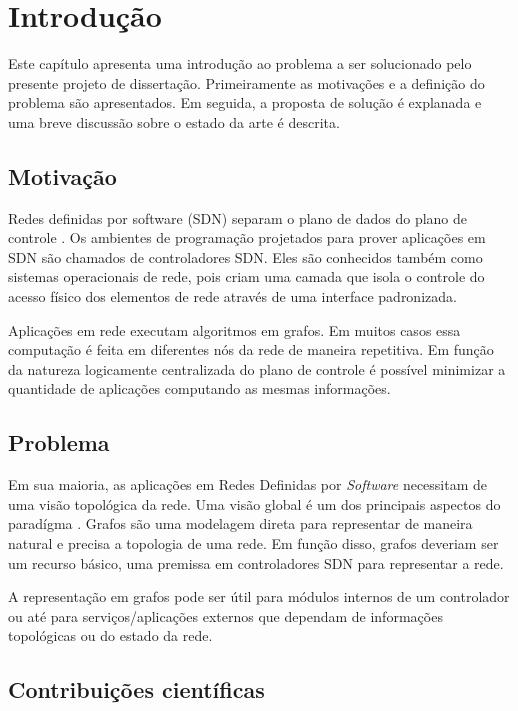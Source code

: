 \chapter{Introdução}
\label{chap:introduction}

Este capítulo apresenta uma introdução ao problema a ser solucionado pelo 
presente projeto de dissertação. 
Primeiramente as motivações e a definição do problema são apresentados. 
Em seguida, a proposta de solução é explanada e uma breve discussão sobre 
o estado da arte é descrita.

\section{Motivação}

Redes definidas por software (SDN) separam o plano de dados do plano 
de controle \citep{guedes2012redes}.
Os ambientes de programação projetados para prover aplicações em SDN são 
chamados de controladores SDN.
Eles são conhecidos também como sistemas operacionais de rede, pois criam uma
camada que isola o controle do acesso físico dos elementos de rede através 
de uma interface padronizada.

Aplicações em rede executam algoritmos em grafos.
Em muitos casos essa computação é feita em diferentes nós da rede de maneira 
repetitiva.
Em função da natureza logicamente centralizada do plano de controle é possível
minimizar a quantidade de aplicações computando as mesmas informações.

\section{Problema}

Em sua maioria, as aplicações em Redes Definidas por \emph{Software} necessitam
de uma visão topológica da rede.
Uma visão global é um dos principais aspectos do paradígma 
\citep{martin2010virtualizing}.
Grafos são uma modelagem direta para representar de maneira natural e precisa 
a topologia de uma rede.
Em função disso, grafos deveriam ser um recurso básico, uma premissa em 
controladores SDN para representar a rede.

A representação em grafos pode ser útil para módulos internos de um controlador
ou até para serviços/aplicações externos que dependam de informações 
topológicas ou do estado da rede.

\section{Contribuições científicas}

